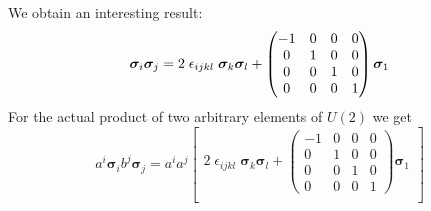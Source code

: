 \documentclass[11pt, oneside]{article}   	%
\begin{document}
%
We obtain an interesting result:
\begin{equation} \bm{\sigma}_i \bm{\sigma}_j = 
    2 \; \epsilon_{ijkl} \; \bm{\sigma}_k \bm{\sigma}_l 
    +
    \begin{pmatrix}
        -1 & 0  & 0  & 0 \\
         0 & 1  & 0  & 0 \\
         0 & 0  & 1  & 0 \\
         0 & 0  & 0  & 1
    \end{pmatrix} \bm{\sigma}_1 \\
\end{equation}
%
For the actual product of two arbitrary elements of $U(2)$ we get
\begin{equation}
    a^i\bm{\sigma}_i b^j\bm{\sigma}_j = 
    a^i a^j
    \begin{bmatrix}
        2 \; \epsilon_{ijkl} \; \bm{\sigma}_k \bm{\sigma}_l +
        \begin{pmatrix}
            -1 & 0  & 0  & 0 \\
             0 & 1  & 0  & 0 \\
             0 & 0  & 1  & 0 \\
             0 & 0  & 0  & 1
        \end{pmatrix} \bm{\sigma}_1 \\
    \end{bmatrix}
\end{equation}
\end{document}
